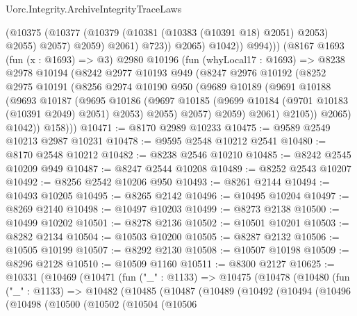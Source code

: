 \begin{lexlean}{Uorc.Integrity.ArchiveIntegrityTraceLaws}
\begin{coremodule}
                        (@10375
                          (@10377 (@10379 (@10381 (@10383 (@10391 @18) @2051) @2053) @2055) @2057)
                          @2059)
                        @2061)
                      @723))
                  @2065)
                @1042))
            @994)))
      (@8167
        @1693
        (fun (x : @1693) => @3)
        @2980
        @10196
        (fun (whyLocal17 : @1693) =>
        @8238
          @2978
          @10194
          (@8242
            @2977
            @10193
            @949
            (@8247
              @2976
              @10192
              (@8252
                @2975
                @10191
                (@8256
                  @2974
                  @10190
                  @950
                  (@9689
                    @10189
                    (@9691
                      @10188
                      (@9693
                        @10187
                        (@9695
                          @10186
                          (@9697
                            @10185
                            (@9699 @10184 (@9701 @10183 (@10391 @2049) @2051) @2053)
                            @2055)
                          @2057)
                        @2059)
                      @2061)
                    @2105))
                @2065)
              @1042))
          @158)))
@10471 := @8170 @2989 @10233
@10475 := @9589 @2549 @10213 @2987 @10231
@10478 := @9595 @2548 @10212 @2541
@10480 := @8170 @2548 @10212
@10482 := @8238 @2546 @10210
@10485 := @8242 @2545 @10209 @949
@10487 := @8247 @2544 @10208
@10489 := @8252 @2543 @10207
@10492 := @8256 @2542 @10206 @950
@10493 := @8261 @2144
@10494 := @10493 @10205
@10495 := @8265 @2142
@10496 := @10495 @10204
@10497 := @8269 @2140
@10498 := @10497 @10203
@10499 := @8273 @2138
@10500 := @10499 @10202
@10501 := @8278 @2136
@10502 := @10501 @10201
@10503 := @8282 @2134
@10504 := @10503 @10200
@10505 := @8287 @2132
@10506 := @10505 @10199
@10507 := @8292 @2130
@10508 := @10507 @10198
@10509 := @8296 @2128
@10510 := @10509 @1160
@10511 := @8300 @2127
@10625 := @10331
    (@10469
      (@10471
        (fun ("_" : @1133) =>
        @10475
          (@10478
            (@10480
              (fun ("_" : @1133) =>
              @10482
                (@10485
                  (@10487
                    (@10489
                      (@10492
                        (@10494
                          (@10496
                            (@10498
                              (@10500
                                (@10502
                                  (@10504
                                    (@10506

\end{coremodule}
\end{lexlean}
